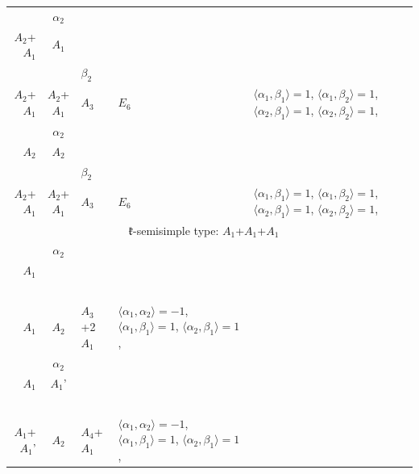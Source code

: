 \documentclass[12pt]{report}
\begin{document}
\begin{appendix}
{\begin{longtable}{rcl p{1cm}p{1cm}p{3cm} }
\\
\begin{tabular}{cc}$\alpha_1$+ & $\alpha_2$\\\tiny{ $A_2$+$A_1$ } & \tiny{ $A_1$ }\end{tabular} &\begin{tabular}{c} = \\~ \end{tabular} & \begin{tabular}{cc}$\beta_1$+ & $\beta_2$\\\tiny{ $A_2$+$A_1$ } & \tiny{ $A_2$+$A_1$ }\end{tabular} & $A_3$ & $E_6$ &  $\langle\alpha_1, \beta_1\rangle=1$, $\langle\alpha_1, \beta_2\rangle=1$, $\langle\alpha_2, \beta_1\rangle=1$, $\langle\alpha_2, \beta_2\rangle=1$, 
\\
\begin{tabular}{cc}$\alpha_1$+ & $\alpha_2$\\\tiny{ $A_2$ } & \tiny{ $A_2$ }\end{tabular} &\begin{tabular}{c} = \\~ \end{tabular} & \begin{tabular}{cc}$\beta_1$+ & $\beta_2$\\\tiny{ $A_2$+$A_1$ } & \tiny{ $A_2$+$A_1$ }\end{tabular} & $A_3$ & $E_6$ &  $\langle\alpha_1, \beta_1\rangle=1$, $\langle\alpha_1, \beta_2\rangle=1$, $\langle\alpha_2, \beta_1\rangle=1$, $\langle\alpha_2, \beta_2\rangle=1$, 
\\
\hline\multicolumn{5}{c}{$\mathfrak{k}$-semisimple type: $A_1$+$A_1$+$A_1$}\\
\hline\hline\begin{tabular}{cc}$\alpha_1$+ & $\alpha_2$\\\tiny{ $A_1$ } & \tiny{  }\end{tabular} &\begin{tabular}{c} = \\~ \end{tabular} & \begin{tabular}{c}$\beta_1$\\\tiny{ $A_1$ }\end{tabular} & $A_2$ & $A_3$+2$A_1$ & $\langle\alpha_1, \alpha_2\rangle=-1$,  $\langle\alpha_1, \beta_1\rangle=1$, $\langle\alpha_2, \beta_1\rangle=1$, 
\\
\begin{tabular}{cc}$\alpha_1$+ & $\alpha_2$\\\tiny{ $A_1$ } & \tiny{ $A_1$' }\end{tabular} &\begin{tabular}{c} = \\~ \end{tabular} & \begin{tabular}{c}$\beta_1$\\\tiny{ $A_1$+$A_1$' }\end{tabular} & $A_2$ & $A_4$+$A_1$ & $\langle\alpha_1, \alpha_2\rangle=-1$,  $\langle\alpha_1, \beta_1\rangle=1$, $\langle\alpha_2, \beta_1\rangle=1$, 

\end{longtable}}
\end{appendix}
\end{document}
